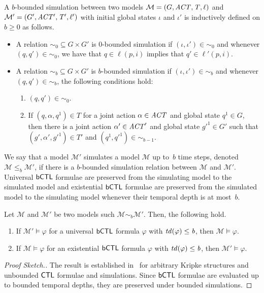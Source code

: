 \begin{definition}
A $b$-bounded simulation between two models $\mathcal M = \left ( G, \it{ACT}, T,
\ell \right )$ and $\mathcal{M'} = \left ( G', \it{ACT'}, T', \ell' \right )$  with initial
global states $\iota$ and $\iota'$ is inductively defined on $b \geq 0$ as
follows.
\begin{itemize}
    \item A relation $\sim_0 \subseteq G \times G'$ is  $0$-bounded simulation
    if $(\iota, \iota') \in \sim_0$ and whenever $(q, q') \in \sim_0$, we have
    that $q \in \ell(p,i)$ implies that $q' \in \ell'(p, i)$.
    \item A relation $\sim_b \subseteq G \times G'$ is  $b$-bounded simulation
    if $(\iota, \iota') \in \sim_b$ and  whenever $(q, q') \in \sim_b$, the
    following conditions hold:
    \begin{enumerate}
    \item $(q, q') \in \sim_0$.
    \item If $(q, \alpha, q^1) \in T$ for a joint action $\alpha \in \it{ACT}$ and
    global state $q^1 \in G$, then there is a joint action
    $\alpha' \in \it{ACT}'$ and global state $g'^1 \in G'$ such that
    $(g', \alpha', g'^1) \in T'$ and 
    $(q^1, q'^1) \in \sim_{b - 1}$.  
\end{enumerate}
\end{itemize}
\end{definition}

We say that a model $\mathcal{M'}$ simulates a model $\mathcal M$ up to~$b$ time
steps, denoted $\mathcal M \leq_b \mathcal{M'}$, if there is a $b$-bounded
simulation relation between $\mathcal M$ and $\mathcal{M'}$.  Universal $\sf{bCTL}$
formulae are preserved from the simulating model to the simulated model and
existential $\sf{bCTL}$ formulae are preserved from the simulated model to the
simulating model whenever their temporal depth is at most~$b$. 

\begin{theorem} Let $\mathcal M$ and $\mathcal M'$ be two models such $\mathcal
M \sim_b  \mathcal M'$. Then, the following hold.
\label{th:sim}
\begin{enumerate}
    \item If $\mathcal M' \models \varphi$ for a universal $\sf{bCTL}$ formula
    $\varphi$ with $\it{td}(\varphi) \leq b$, then $\mathcal M \models
    \varphi$.
    \item If $\mathcal M \models \varphi$ for an existential $\sf{bCTL}$ formula
    $\varphi$ with $\it{td}(\varphi) \leq b$, then $\mathcal M' \models
    \varphi$.
\end{enumerate}
\end{theorem}
\begin{proof}[Proof Sketch.]
The result is established in~\cite{ClarkeGrumbergLong94} for arbitrary Kripke
structures and unbounded $\sf{CTL}$ formulae and simulations. Since $\sf{bCTL}$ formulae
are evaluated up to bounded temporal depths, they are preserved under bounded
simulations.
\end{proof}

